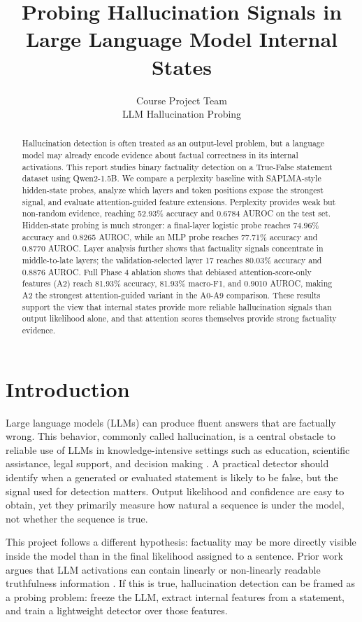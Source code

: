 \documentclass[11pt]{article}
\title{Probing Hallucination Signals in Large Language Model Internal States}
\author{
  Course Project Team \\
  LLM Hallucination Probing
}
\begin{document}
\maketitle

\begin{abstract}
Hallucination detection is often treated as an output-level problem, but a language model may already encode evidence about factual correctness in its internal activations. This report studies binary factuality detection on a True-False statement dataset using Qwen2-1.5B. We compare a perplexity baseline with SAPLMA-style hidden-state probes, analyze which layers and token positions expose the strongest signal, and evaluate attention-guided feature extensions. Perplexity provides weak but non-random evidence, reaching 52.93\% accuracy and 0.6784 AUROC on the test set. Hidden-state probing is much stronger: a final-layer logistic probe reaches 74.96\% accuracy and 0.8265 AUROC, while an MLP probe reaches 77.71\% accuracy and 0.8770 AUROC. Layer analysis further shows that factuality signals concentrate in middle-to-late layers; the validation-selected layer 17 reaches 80.03\% accuracy and 0.8876 AUROC. Full Phase 4 ablation shows that debiased attention-score-only features (A2) reach 81.93\% accuracy, 81.93\% macro-F1, and 0.9010 AUROC, making A2 the strongest attention-guided variant in the A0-A9 comparison. These results support the view that internal states provide more reliable hallucination signals than output likelihood alone, and that attention scores themselves provide strong factuality evidence.
\end{abstract}

\section{Introduction}

Large language models (LLMs) can produce fluent answers that are factually wrong. This behavior, commonly called hallucination, is a central obstacle to reliable use of LLMs in knowledge-intensive settings such as education, scientific assistance, legal support, and decision making \citep{ji2023survey,li2023halueval}. A practical detector should identify when a generated or evaluated statement is likely to be false, but the signal used for detection matters. Output likelihood and confidence are easy to obtain, yet they primarily measure how natural a sequence is under the model, not whether the sequence is true.

This project follows a different hypothesis: factuality may be more directly visible inside the model than in the final likelihood assigned to a sentence. Prior work argues that LLM activations can contain linearly or non-linearly readable truthfulness information \citep{azaria2023internal,burns2022discovering}. If this is true, hallucination detection can be framed as a probing problem: freeze the LLM, extract internal features from a statement, and train a lightweight detector over those features.
\end{document}
